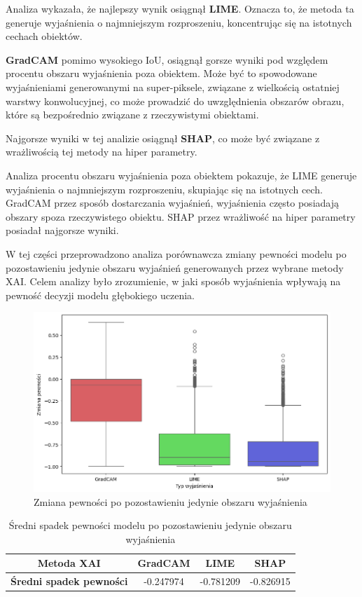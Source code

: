 Analiza wykazała, że najlepszy wynik osiągnął \textbf{LIME}.
Oznacza to, że metoda ta generuje wyjaśnienia o najmniejszym rozproszeniu, koncentrując się na istotnych cechach obiektów.

\textbf{GradCAM} pomimo wysokiego IoU, osiągnął gorsze wyniki pod względem procentu obszaru wyjaśnienia poza obiektem.
Może być to spowodowane wyjaśnieniami generowanymi na super-piksele, związane z wielkością ostatniej warstwy konwolucyjnej, co może prowadzić do uwzględnienia obszarów obrazu, które są bezpośrednio związane z rzeczywistymi obiektami.

Najgorsze wyniki w tej analizie osiągnął \textbf{SHAP}, co może być związane z wrażliwością tej metody na hiper parametry.

Analiza procentu obszaru wyjaśnienia poza obiektem pokazuje, że LIME generuje wyjaśnienia o najmniejszym rozproszeniu, skupiając się na istotnych cech.
GradCAM przez sposób dostarczania wyjaśnień, wyjaśnienia często posiadają obszary spoza rzeczywistego obiektu.
SHAP przez wrażliwość na hiper parametry posiadał najgorsze wyniki.

\vspace{1cm}

W tej części przeprowadzono analiza porównawcza zmiany pewności modelu po pozostawieniu jedynie obszaru wyjaśnień generowanych przez wybrane metody XAI.
Celem analizy było zrozumienie, w jaki sposób wyjaśnienia wpływają na pewność decyzji modelu głębokiego uczenia.

\begin{figure}[h]
	\centering\includegraphics[width=.9\textwidth]{img/base_confidence_exp}
	\caption{Zmiana pewności po pozostawieniu jedynie obszaru wyjaśnienia}  \label{rys:base_confidence_exp}
\end{figure}

\begin{table}[h]
	\centering
	\begin{tabular}{|c|c|c|c|}
		\hline
		\textbf{Metoda XAI}             & \textbf{GradCAM} & \textbf{LIME} & \textbf{SHAP} \\
		\hline
		\textbf{Średni spadek pewności} & -0.247974        & -0.781209     & -0.826915     \\
		\hline
	\end{tabular}
	\caption{Średni spadek pewności modelu po pozostawieniu jedynie obszaru wyjaśnienia}
	\label{tab:base_confidence_exp}
\end{table}

